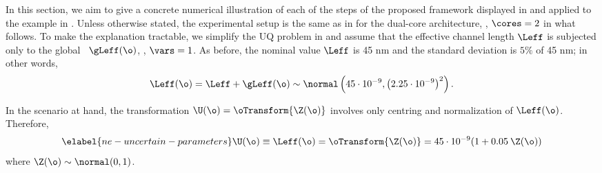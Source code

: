 In this section, we aim to give a concrete numerical illustration of each of the steps of the proposed framework displayed in  and applied to the example in . Unless otherwise stated, the experimental setup is the same as in  for the dual-core architecture, \ie, $\cores = 2$ in what follows. To make the explanation tractable, we simplify the UQ problem in  and assume that the effective channel length $\Leff$ is subjected only to the global \rv\ $\gLeff(\o)$, \ie, $\vars = 1$. As before, the nominal value $\Leff$ is 45 nm and the standard deviation is $5\%$ of 45 nm; in other words,
\[
  \Leff(\o) = \Leff + \gLeff(\o) \sim \normal\left(45 \cdot 10^{-9}, \left(2.25 \cdot 10^{-9}\right)^2\right).
\]

 In the scenario at hand, the transformation $\U(\o) = \oTransform{\Z(\o)}$ involves only centring and normalization of $\Leff(\o)$. Therefore,
\begin{equation} \elabel{ne-uncertain-parameters}
  \U(\o) \equiv \Leff(\o) = \oTransform{\Z(\o)} = 45 \cdot 10^{-9} (1 + 0.05 \: \Z(\o))
\end{equation}
where $\Z(\o) \sim \normal(0, 1)$.

